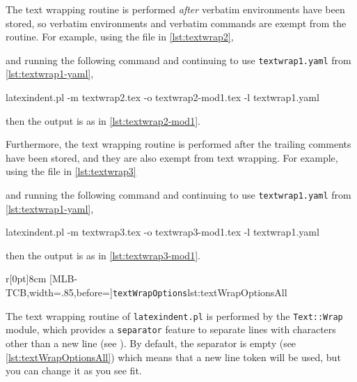 	The text wrapping routine is performed \emph{after} verbatim environments have been stored, so verbatim environments and verbatim commands are exempt from the routine.
	For example, using the file in \cref{lst:textwrap2}, \begin{widepage}  \end{widepage} and running the following command and continuing to use \texttt{textwrap1.yaml} from \cref{lst:textwrap1-yaml}, \begin{commandshell}
latexindent.pl -m textwrap2.tex -o textwrap2-mod1.tex -l textwrap1.yaml
\end{commandshell} then the output is as in \cref{lst:textwrap2-mod1}.
	\begin{widepage}
	\end{widepage}
	Furthermore, the text wrapping routine is performed after the trailing comments have been stored, and they are also exempt from text wrapping.
	For example, using the file in \cref{lst:textwrap3} \begin{widepage}  \end{widepage} and running the following command and continuing to use \texttt{textwrap1.yaml} from \cref{lst:textwrap1-yaml}, \begin{commandshell}
latexindent.pl -m textwrap3.tex -o textwrap3-mod1.tex -l textwrap1.yaml
\end{commandshell} then the output is as in \cref{lst:textwrap3-mod1}.


	\begin{wrapfigure}[6]{r}[0pt]{8cm}
		[MLB-TCB,width=.85\linewidth,before=\centering]{\texttt{textWrapOptions}}{lst:textWrapOptionsAll}
	\end{wrapfigure}
	The text wrapping routine of \texttt{latexindent.pl} is performed by the \texttt{Text::Wrap} module, which provides a \texttt{separator} feature to separate lines with characters other than a new line (see \cite{textwrap}).
	By default, the separator is empty (see \cref{lst:textWrapOptionsAll}) which means that a new line token will be used, but you can change it as you see fit.

